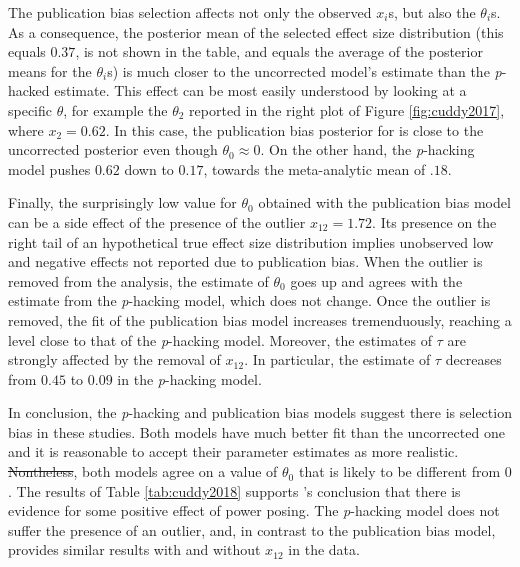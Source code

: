 \documentclass[useAMS,usenatbib,referee]{biom}
\providecommand{\DIFaddtex}[1]{{\protect\color{green}\uwave{#1}}} %
\providecommand{\DIFdeltex}[1]{{\protect\color{red}\sout{#1}}}                      %
\providecommand{\DIFaddbegin}{} %
\providecommand{\DIFaddend}{} %
\providecommand{\DIFdelbegin}{} %
\providecommand{\DIFdelend}{} %
\providecommand{\DIFadd}[1]{\texorpdfstring{\DIFaddtex{#1}}{#1}} %
\providecommand{\DIFdel}[1]{\texorpdfstring{\DIFdeltex{#1}}{}} %
\begin{document}
The publication bias selection affects not only the observed $x_{i}$s, but also the $\theta_{i}$s. As a consequence, the posterior mean of the selected effect size distribution (this equals $0.37$, is not shown in the table, and equals the average of the posterior means for the $\theta_{i}$s) is much closer to the uncorrected model's estimate than the \textit{p}-hacked estimate. This effect can be most easily understood by looking at a specific $\theta$, for example the $\theta_2$ reported in the right plot of Figure \ref{fig:cuddy2017}, where $x_{2}=0.62$. In this case, the publication bias posterior for is close to the uncorrected posterior even though $\theta_0 \approx 0$. On the other hand, the \textit{p}-hacking model pushes $0.62$ down to $0.17$, towards the meta-analytic mean of \DIFdelbegin \DIFdel{$.18$}\DIFdelend \DIFaddbegin \DIFadd{$0.18$}\DIFaddend .

Finally, the surprisingly low value for $\theta_0$ obtained with the publication bias model can be a side effect of the presence of the outlier $x_{12} = 1.72$. Its presence on the right tail of an hypothetical true effect size distribution implies unobserved low and negative effects not reported due to publication bias. When the outlier is removed from the analysis, the estimate of $\theta_{0}$ goes up and agrees with the estimate from the \textit{p}-hacking model, which does not change. Once the outlier is removed, the fit of the publication bias model increases tremenduously, reaching a level close to that of the \textit{p}-hacking model. Moreover, the estimates of $\tau$ are strongly affected by the removal of $x_{12}$. In particular, the estimate of $\tau$ decreases from $0.45$ to $0.09$ in the \textit{p}-hacking model.



In conclusion, the \textit{p}-hacking and publication bias models suggest there is selection bias in these studies. Both models have much better fit than the uncorrected one and it is reasonable to accept their parameter estimates as more realistic. \DIFdelbegin \DIFdel{Nontheless}\DIFdelend \DIFaddbegin \DIFadd{Nonetheless}\DIFaddend , both models agree on a value of $\theta_{0}$ that is likely to be different from $0$. The results of Table \ref{tab:cuddy2018} supports \citet{cuddy2018p}'s conclusion that there is evidence for some positive effect of power posing. The \textit{p}-hacking model does not suffer the presence of an outlier, and, in contrast to the publication bias model, provides similar results with and without $x_{12}$ in the data.
\end{document}
